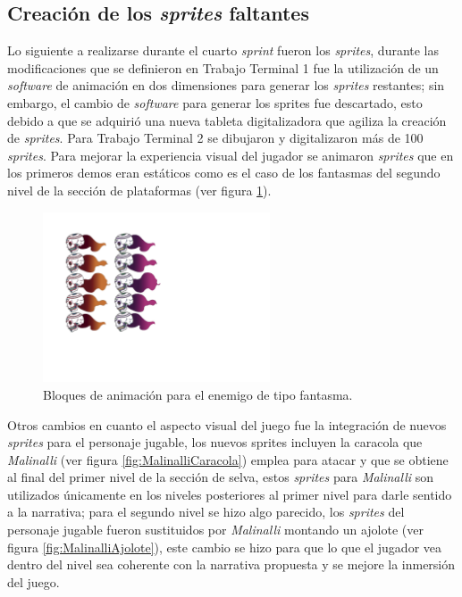 \subsection{Creación de los \textit{sprites} faltantes}
Lo siguiente a realizarse durante el cuarto \textit{sprint} fueron los \textit{sprites},
durante las modificaciones que se definieron en Trabajo Terminal 1 fue la
utilización de un \textit{software} de animación en dos dimensiones para generar
los \textit{sprites} restantes; sin embargo, el cambio de \textit{software} para
generar los sprites fue descartado, esto debido a que se adquirió una nueva
tableta digitalizadora que agiliza la creación de \textit{sprites}. Para Trabajo
Terminal 2 se dibujaron y digitalizaron más de 100 \textit{sprites}. Para mejorar
la experiencia visual del jugador se animaron \textit{sprites} que en los primeros
demos eran estáticos como es el caso de los fantasmas del segundo nivel de la
sección de plataformas (ver figura \ref{fig:FantasmaAnimacion}).

\begin{figure}[h]
    \centering
    \includegraphics[width=0.6\textwidth]{03TrabajoRealizado/imagenes/fantasmas.png}
     \caption{Bloques de animación para el enemigo de tipo fantasma.}
    \label{fig:FantasmaAnimacion}        
\end{figure}

Otros cambios en cuanto el aspecto visual del juego fue la integración de nuevos
\textit{sprites} para el personaje jugable, los nuevos sprites incluyen la
caracola que \textit{Malinalli} (ver figura \ref{fig:MalinalliCaracola}) emplea
para atacar y que se obtiene al final del primer nivel de la sección de selva,
estos \textit{sprites} para \textit{Malinalli} son utilizados únicamente en los
niveles posteriores al primer nivel para darle sentido a la narrativa; para el
segundo nivel se hizo algo parecido, los \textit{sprites} del personaje jugable
fueron sustituidos por \textit{Malinalli} montando un ajolote (ver figura
\ref{fig:MalinalliAjolote}), este cambio se hizo para que lo que el jugador vea
dentro del nivel sea coherente con la narrativa propuesta y se mejore la inmersión del juego.

